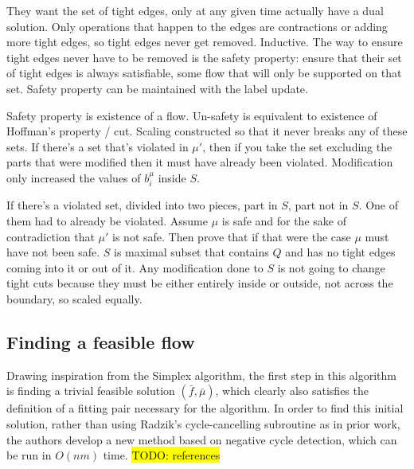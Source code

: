 \documentclass[12pt]{article}
\theoremstyle{definition}
\newcommand{\biu}{b_{i}^{\mu}}
\newcommand{\todo}[1]{\colorbox{yellow}{TODO: #1}}
\begin{document}
They want the set of tight edges, only at any given time actually have a dual solution. Only operations that happen to the edges are contractions or adding more tight edges, so tight edges never get removed. Inductive. The way to ensure tight edges never have to be removed is the safety property: ensure that their set of tight edges is always satisfiable, some flow that will only be supported on that set. Safety property can be maintained with the label update. 

Safety property is existence of a flow. Un-safety is equivalent to existence of Hoffman's property / cut. Scaling constructed so that it never breaks any of these sets. If there's a set that's violated in $\mu'$, then if you take the set excluding the parts that were modified then it must have already been violated. Modification only increased the values of $\biu$ inside $S$.

If there's a violated set, divided into two pieces, part in $S$, part not in $S$. One of them had to already be violated. Assume $\mu$ is safe and for the sake of contradiction that $\mu'$ is not safe. Then prove that if that were the case $\mu$ must have not been safe. 
$S$ is maximal subset that contains $Q$ and has no tight edges coming into it or out of it. Any modification done to $S$ is not going to change tight cuts because they must be either entirely inside or outside, not across the boundary, so scaled equally. 




    \subsection{Finding a feasible flow}
Drawing inspiration from the Simplex algorithm, the first step in this algorithm is finding a trivial feasible solution $(\bar{f}, \bar{\mu})$, which clearly also satisfies the definition of a fitting pair necessary for the algorithm. In order to find this initial solution, rather than using Radzik's cycle-cancelling subroutine as in prior work, the authors develop a new method based on negative cycle detection, which can be run in $O(nm)$ time. \todo{references} 
    
\end{document}
